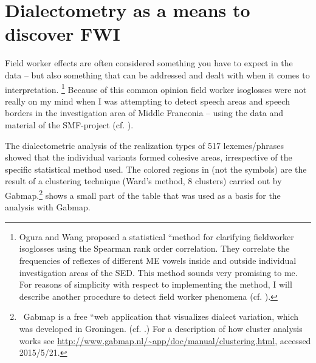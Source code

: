 \documentclass[output=paper]{LSP/langsci}
\begin{document}
\section{Dialectometry as a means to discover FWI}
Field worker effects are often considered something you have to expect in the data – but also something that can be addressed and dealt with when it comes to interpretation.%
\footnote{Ogura and Wang proposed a statistical ``method for clarifying fieldworker isoglosses{\textquotedbl} using the Spearman rank order correlation. They correlate the frequencies of reflexes of different ME vowels inside and outside individual investigation areas of the SED. This method sounds very promising to me. For reasons of simplicity with respect to implementing the method, I will describe another procedure to detect field worker phenomena (cf. \citealt{ogura_isoglosses_1992}).}
Because of this common opinion field worker isoglosses were not really on my mind when I was attempting to detect speech areas and speech borders in the investigation area of Middle Franconia – using the data and material of the SMF-project (cf. \citealt{mathussek_sprachraume_2014}).

The dialectometric analysis of the realization types of 517 lexemes/phrases showed that the individual variants formed cohesive areas, irrespective of the specific statistical method used. %
The colored regions in  (not the symbols) are the result of a clustering technique (Ward's method, 8 clusters) carried out by Gabmap.\footnote{\ Gabmap is a free ``web application that visualizes dialect variation{\textquotedbl}, which was developed in Groningen. (cf. \citealt{nerbonne_gabmap_2011}.) For a description of how cluster analysis works see \url{http://www.gabmap.nl/\~app/doc/manual/clustering.html}, accessed 2015/5/21.}  shows a small part of the table that was used as a basis for the analysis with Gabmap.
\end{document}
